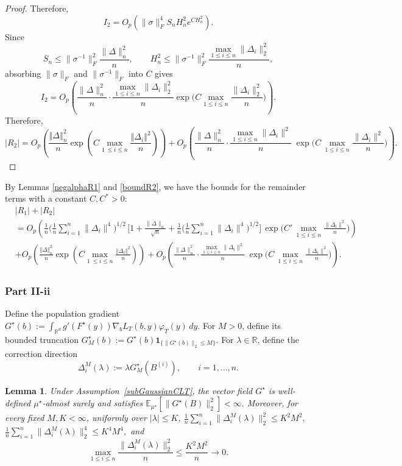 \documentclass[11pt]{article}
\newtheorem{lemma}{Lemma}
\theoremstyle{definition}
\newcommand{\E}{\mathbb{E}}
\begin{document}
\begin{proof}
Therefore,
\[
I_2
=
O_p\!\left(
\|\sigma\|_F^4S_nH_n^2e^{CH_n^2}
\right).
\]
Since
\[
S_n
\le
\|\sigma^{-1}\|_F^2
\frac{\|\Delta\|_n^2}{n},
\qquad
H_n^2
\le
\|\sigma^{-1}\|_F^2
\frac{\max_{1\le i\le n}\|\Delta_i\|_2^2}{n},
\]
absorbing $\|\sigma\|_F$ and $\|\sigma^{-1}\|_F$ into $C$ gives
\[
I_2
=
O_p\!\left(
\frac{\|\Delta\|_n^2}{n}
\cdot
\frac{\max_{1\le i\le n}\|\Delta_i\|_2^2}{n}
\exp\!\Big(
C\max_{1\le i\le n}
\frac{\|\Delta_i\|_2^2}{n}
\Big)
\right).
\]
Therefore, 
$$|R_2| = O_p\left(\frac{\left\Vert \Delta\right\Vert_n^2}{n}\exp\left(C\max_{1\ \leq i \leq n}\frac{\left\Vert \Delta_i\right\Vert^2}{n}\right)\right) + O_p\!\left(
\frac{\|\Delta\|_n^2}{n}\cdot \frac{\max_{1\le i\le n}\|\Delta_i\|^2}{n}\;
\exp\!\Big(C\,\max_{1\le i\le n}\frac{\|\Delta_i\|^2}{n}\Big)
\right).$$
\end{proof}
By Lemmas \ref{negalphaR1} and \ref{boundR2}, we have the bounds for the remainder terms with a constant $C, C^* >0$:
\begin{align*}
    &|R_1| + |R_2|\\
    &= O_p\!\left(
\frac{1}{n}\Big(\frac{1}{n}\sum_{i=1}^n \|\Delta_i\|^4\Big)^{\!1/2}\,
\Big[1+\frac{\|\Delta\|_n}{\sqrt{n}}+\frac{1}{n}\Big(\frac{1}{n}\sum_{i=1}^n \|\Delta_i\|^4\Big)^{\!1/2}\Big]\,
\exp\!\Big(C'\,\max_{1\le i\le n}\frac{\|\Delta_i\|^2}{n}\Big)
\right)\\
&+ O_p\left(\frac{\left\Vert \Delta\right\Vert_n^2}{n}\exp\left(C\max_{1\ \leq i \leq n}\frac{\left\Vert \Delta_i\right\Vert^2}{n}\right)\right) + O_p\!\left(
\frac{\|\Delta\|_n^2}{n}\cdot \frac{\max_{1\le i\le n}\|\Delta_i\|^2}{n}\;
\exp\!\Big(C\,\max_{1\le i\le n}\frac{\|\Delta_i\|^2}{n}\Big)
\right).
\end{align*} 
\subsubsection{Part II-ii}

Define the population gradient $G^\star(b)
:=
\int_{\mathbb R^d}
g'\!\left(F^\star(y)\right)
\nabla_bL_T(b,y)
\varphi_T(y)\,dy.$
For $M>0$, define its bounded truncation $G_M^\star(b)
:=
G^\star(b)
\mathbf 1_{\{\|G^\star(b)\|_2\leq M\}}.$
For $\lambda\in\mathbb R$, define the correction direction
\[
\Delta_i^{M}(\lambda)
:=
\lambda G_M^\star(B^{(i)}),
\qquad
i=1,\ldots,n.
\]

\begin{lemma}\label{lem:Ci-moment-only}
Under Assumption~\ref{subGaussianCLT}, the vector field $G^\star$ is
well-defined $\mu^\star$-almost surely and satisfies $\E_{\mu^\star}
\left[
\|G^\star(B)\|_2^2
\right]
<\infty.$
Moreover, for every fixed $M,K<\infty$, uniformly over
$|\lambda|\leq K$, $\frac1n
\sum_{i=1}^n
\|\Delta_i^{M}(\lambda)\|_2^2
\leq
K^2M^2,$ $\frac1n
\sum_{i=1}^n
\|\Delta_i^{M}(\lambda)\|_2^4
\leq
K^4M^4,$
and
\[
\max_{1\leq i\leq n}
\frac{\|\Delta_i^{M}(\lambda)\|_2^2}{n}
\leq
\frac{K^2M^2}{n}
\longrightarrow0.
\]
\end{lemma}
\end{document}
